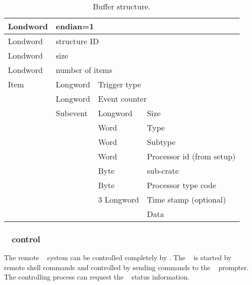\begin{table}[h]
\begin{tabular}{|p{2.0cm}|p{2.0cm}|p{2.0cm}|p{8.0cm}|}      \hline
Londword & \multicolumn{3}{l|}{endian=1} \\ \hline
Londword & \multicolumn{3}{l|}{structure ID} \\ \hline
Londword & \multicolumn{3}{l|}{size} \\ \hline
Londword & \multicolumn{3}{l|}{number of items} \\ \hline
Item & Longword & \multicolumn{2}{l|}{Trigger type} \\ \hline
 & Longword & \multicolumn{2}{l|}{Event counter} \\ \hline
 & Subevent & Longword & Size \\ \hline
 &  & Word & Type \\ \hline
 &  & Word & Subtype \\ \hline
 &  & Word & Processor id (from setup)\\ \hline
 &  & Byte & sub-crate \\ \hline
 &  & Byte & Processor type code \\ \hline
 &  & 3 Longword & Time stamp (optional) \\ \hline
 &  & & Data \\ \hline
\end{tabular}
\caption{Buffer structure.}
\label{dtor-mbs-buffer-table}
\end{table}


\subsubsection{\mbs~ control}
The remote \mbs~ system can be controlled completely by \dabc.
The \mbs~ is started by remote shell commands and controlled by
sending commands to the \mbs~ prompter. The controlling process
can request the \mbs~ status information.
